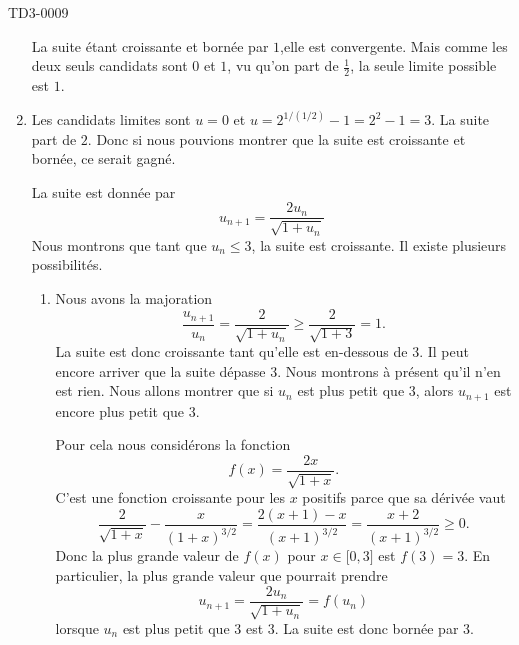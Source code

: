 \begin{corrige}{TD3-0009}
\begin{enumerate}
			La suite étant croissante et bornée par $1$,elle est convergente. Mais comme les deux seuls candidats sont $0$ et $1$, vu qu'on part de $\frac{ 1 }{2}$, la seule limite possible est $1$.
		\item
			Les candidats limites sont $u=0$ et $u=2^{1/(1/2)}-1=2^2-1=3$. La suite part de $2$. Donc si nous pouvions montrer que la suite est croissante et bornée, ce serait gagné.

			La suite est donnée par
			\begin{equation}
				u_{n+1}=\frac{ 2u_n }{ \sqrt{1+u_n} }
			\end{equation}
            Nous montrons que tant que \( u_n\leq 3\), la suite est croissante. Il existe plusieurs possibilités.

            \begin{enumerate}
                    \item
                Nous avons la majoration
                \begin{equation}        \label{Eqmaktzzzncn}
                    \frac{ u_{n+1} }{ u_n }=\frac{ 2 }{ \sqrt{1+u_n} }\geq \frac{ 2 }{ \sqrt{1+3} }=1.
                \end{equation}
                La suite est donc croissante tant qu'elle est en-dessous de \( 3\). Il peut encore arriver que la suite dépasse \( 3\). Nous montrons à présent qu'il n'en est rien. Nous allons montrer que si \( u_n\) est plus petit que \( 3\), alors \( u_{n+1}\) est encore plus petit que \( 3\).

                Pour cela nous considérons la fonction
                \begin{equation}
                    f(x)=\frac{ 2x }{ \sqrt{1+x} }.
                \end{equation}
                C'est une fonction croissante pour les \( x\) positifs parce que sa dérivée vaut
                \begin{equation}
                    \frac{ 2 }{ \sqrt{1+x} }-\frac{ x }{ (1+x)^{3/2} }=\frac{ 2(x+1)-x }{ (x+1)^{3/2} }=\frac{ x+2 }{ (x+1)^{3/2} }\geq 0.
                \end{equation}
                Donc la plus grande valeur de \( f(x)\) pour \( x\in\mathopen[ 0 , 3 \mathclose]\) est \( f(3)=3\). En particulier, la plus grande valeur que pourrait prendre
                \begin{equation}
                    u_{n+1}=\frac{ 2u_n }{ \sqrt{1+u_n} }=f(u_n)
                \end{equation}
                lorsque \( u_n\) est plus petit que $3$ est \( 3\). La suite est donc bornée par \( 3\).
            

\end{enumerate}
\end{enumerate}
\end{corrige}

